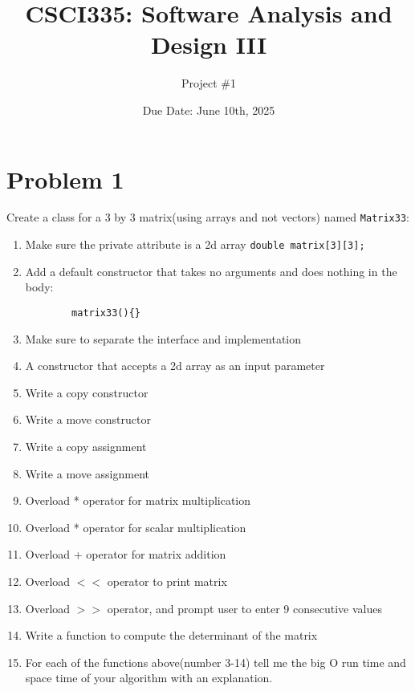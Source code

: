 \documentclass[a4paper]{article}
\title{CSCI335: Software Analysis and Design III}
\author{Project \#1}
\date{Due Date: June 10th, 2025}
\begin{document}
\maketitle


\section*{Problem 1}
Create a class for a 3 by 3 matrix(using arrays and not vectors) named \texttt{Matrix33}:
\begin{enumerate}
    \item Make sure the private attribute is a 2d array \texttt{double matrix[3][3];}
    \item Add a default constructor that takes no arguments and does nothing in the body: \begin{verbatim}
        matrix33(){}
    \end{verbatim}
    \item Make sure to separate the interface and implementation
    \item A constructor that accepts a 2d array as an input parameter
    \item Write a copy constructor
    \item Write a move constructor
    \item Write a copy assignment 
    \item Write a move assignment
    \item Overload * operator for matrix multiplication
    \item Overload * operator for scalar multiplication
    \item Overload + operator for matrix addition
    \item Overload $<<$ operator to print matrix
    \item Overload $>>$ operator, and prompt user to enter 9 consecutive values
    \item Write a function to compute the determinant of the matrix
    \item For each of the functions above(number 3-14) tell me the big O run time and space time of your algorithm with an explanation. 
\end{enumerate}
\newpage
\end{document}
